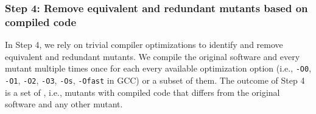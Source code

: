 \subsubsection{Step 4: Remove equivalent and redundant mutants based on compiled code}
%
In Step 4, we rely on trivial compiler optimizations to identify and remove equivalent and redundant mutants.
{We compile the original software and every mutant multiple times once for each every available optimization option (i.e., \texttt{-O0}, \texttt{-O1}, \texttt{-O2}, \texttt{-O3}, \texttt{-Os}, \texttt{-Ofast} in GCC) or a subset of them.
The outcome of Step 4 is a set of , i.e., mutants with compiled code that differs from the original software and any other mutant.
%
%
}
